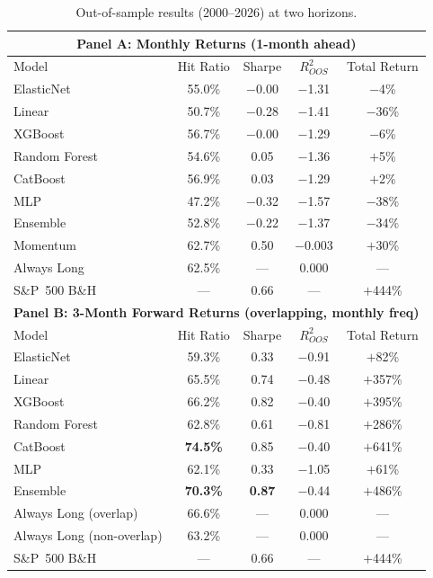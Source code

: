 \documentclass{article}
\begin{document}
\begin{table}[ht]
\centering
\caption{Out-of-sample results (2000--2026) at two horizons.}
\label{tab:main}
\begin{tabular}{lcccc}
\toprule
\multicolumn{5}{c}{\textbf{Panel A: Monthly Returns (1-month ahead)}} \\
\midrule
Model & Hit Ratio & Sharpe & $R^2_{OOS}$ & Total Return \\
\midrule
ElasticNet & 55.0\% & $-$0.00 & $-$1.31 & $-$4\% \\
Linear     & 50.7\% & $-$0.28 & $-$1.41 & $-$36\% \\
XGBoost    & 56.7\% & $-$0.00 & $-$1.29 & $-$6\% \\
Random Forest & 54.6\% & 0.05 & $-$1.36 & $+$5\% \\
CatBoost   & 56.9\% & 0.03 & $-$1.29 & $+$2\% \\
MLP        & 47.2\% & $-$0.32 & $-$1.57 & $-$38\% \\
Ensemble   & 52.8\% & $-$0.22 & $-$1.37 & $-$34\% \\
\midrule
Momentum   & 62.7\% & 0.50 & $-$0.003 & $+$30\% \\
Always Long & 62.5\% & --- & 0.000 & --- \\
S\&P~500 B\&H & --- & 0.66 & --- & $+$444\% \\
\midrule
\midrule
\multicolumn{5}{c}{\textbf{Panel B: 3-Month Forward Returns (overlapping, monthly freq)}} \\
\midrule
Model & Hit Ratio & Sharpe & $R^2_{OOS}$ & Total Return \\
\midrule
ElasticNet & 59.3\% & 0.33 & $-$0.91 & $+$82\% \\
Linear     & 65.5\% & 0.74 & $-$0.48 & $+$357\% \\
XGBoost    & 66.2\% & 0.82 & $-$0.40 & $+$395\% \\
Random Forest & 62.8\% & 0.61 & $-$0.81 & $+$286\% \\
CatBoost   & \textbf{74.5\%} & 0.85 & $-$0.40 & $+$641\% \\
MLP        & 62.1\% & 0.33 & $-$1.05 & $+$61\% \\
Ensemble   & \textbf{70.3\%} & \textbf{0.87} & $-$0.44 & $+$486\% \\
\midrule
Always Long (overlap) & 66.6\% & --- & 0.000 & --- \\
Always Long (non-overlap) & 63.2\% & --- & 0.000 & --- \\
S\&P~500 B\&H & --- & 0.66 & --- & $+$444\% \\
\bottomrule
\end{tabular}
\end{table}
\end{document}
